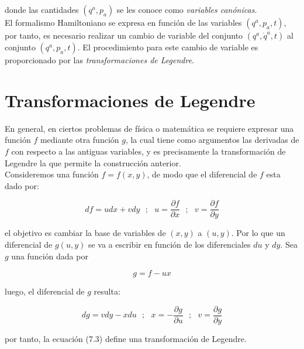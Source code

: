 \documentclass[12pt]{report}
\begin{document}
donde las cantidades $(q^a,p_a)$ se les conoce como \textit{variables canónicas.} \\


El formalismo Hamiltoniano se expresa en función de las variables $\left(q^a,p_a,t\right)$, por tanto, es necesario realizar un cambio de variable del conjunto $(q^a,\dot{q}^a,t)$ al conjunto $(q^a,p_a,t)$. El procedimiento para este cambio de variable es proporcionado por las \textit{transformaciones de Legendre}. 



\section{Transformaciones de Legendre}

En general, en ciertos problemas de física o matemática se requiere expresar una función $f$ mediante otra función $g$, la cual tiene como argumentos las derivadas de $f$ con respecto a las antiguas variables, y es precisamente la transformación de Legendre la que permite la construcción anterior. \\

Consideremos una función $f=f(x,y)$, de modo que el diferencial de $f$ esta dado por:

\begin{equation}
df=udx+vdy \ \ \ ; \ \ \ u=\frac{\partial f}{\partial x}  \ \ \ ; \ \ \ v=\frac{\partial f}{\partial y}
\end{equation}

el objetivo es cambiar la base de variables de $(x,y)$ a $(u,y)$. Por lo que un diferencial de $g(u,y)$ se va a escribir en función de los diferenciales $du$ y $dy$. Sea $g$ una función dada por

\begin{equation}
g=f-ux
\end{equation}


luego, el diferencial de $g$ resulta:

\begin{equation}
dg=vdy-xdu \ \ \ ; \ \ \ x=\displaystyle-\frac{\partial g}{\partial u} \ \ \ ; \ \ \ \displaystyle v=\frac{\partial g}{\partial y}
\end{equation}
 


por tanto, la ecuación (7.3) define una transformación de Legendre.
\end{document}

